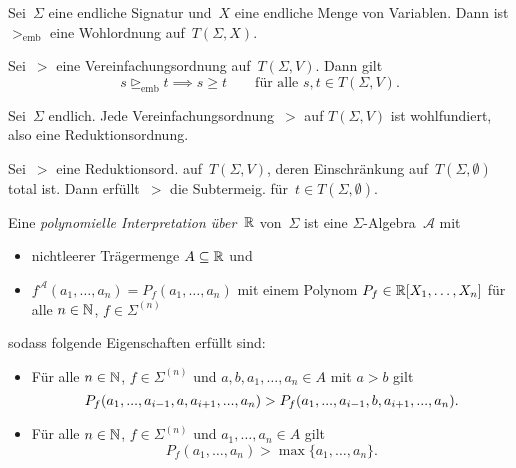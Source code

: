 \documentclass{cheat-sheet}
\renewcommand{\Alg}{\mathcal{A}} %
\newcommand{\emb}{\trianglerighteq_\text{emb}} %
\newcommand{\strictlyEmb}{>_\text{emb}} %
\begin{document}

\begin{thm}
  Sei~$\Sigma$ eine endliche Signatur und~$X$ eine endliche Menge von Variablen.
  Dann ist ${\strictlyEmb}$ eine Wohlordnung auf~$T(\Sigma, X)$.
\end{thm}

\begin{lem}
  Sei~${>}$ eine Vereinfachungsordnung auf~$T(\Sigma, V)$.
  Dann gilt
  \[
    s \emb t \implies s \geq t \qquad
    \text{für alle $s, t \in T(\Sigma, V)$.}
  \]
\end{lem}

\begin{thm}
  Sei~$\Sigma$ endlich.
  Jede Vereinfachungsordnung~${>}$ auf $T(\Sigma, V)$ ist wohlfundiert, also eine Reduktionsordnung.
\end{thm}

\begin{prop}
  Sei~${>}$ eine Reduktionsord. auf~$T(\Sigma, V)$, deren Einschränkung auf~$T(\Sigma, \emptyset)$ total ist.
  Dann erfüllt~${>}$ die Subtermeig. für~$t \in T(\Sigma, \emptyset)$.
\end{prop}


\begin{defn}
  Eine \emph{polynomielle Interpretation über~$\mathbb{R}$} von~$\Sigma$ ist eine $\Sigma$-Algebra~$\Alg$ mit
  \begin{itemize}
    \item nichtleerer Trägermenge $A \subseteq \mathbb{R}$ und
    \item $f^\Alg(a_1, \ldots, a_n) = P_f(a_1, \ldots, a_n)$ mit einem Polynom $P_f \in \mathbb{R}[X_1, \ldots, X_n]$ für alle $n \in \mathbb{N}$, $f \in \Sigma^{(n)}$
  \end{itemize}
  sodass folgende Eigenschaften erfüllt sind:
  \begin{itemize}
    \item Für alle $n \in \mathbb{N}$, $f \in \Sigma^{(n)}$ und $a, b, a_1, \ldots, a_n \in A$ mit $a > b$ gilt
    \[
      P_f(a_1, ..., a_{i-1}, a, a_{i+1}, ..., a_n) > P_f(a_1, ..., a_{i-1}, b, a_{i+1}, ..., a_n).
    \]
    \item Für alle $n \in \mathbb{N}$, $f \in \Sigma^{(n)}$ und $a_1, \ldots, a_n \in A$ gilt
    \[
      P_f(a_1, \ldots, a_n) > \max \{ a_1, \ldots, a_n \}.
    \]
  \end{itemize}
\end{defn}
\end{document}
